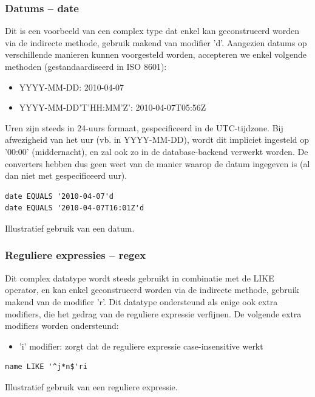 \subsubsection{Datums -- date}

Dit is een voorbeeld van een complex type dat enkel kan geconstrueerd worden via de indirecte methode, gebruik makend van modifier 'd'. Aangezien datums op verschillende manieren kunnen voorgesteld worden, accepteren we enkel volgende methoden (gestandaardiseerd in ISO 8601):
\begin{itemize}
\item{YYYY-MM-DD: 2010-04-07}
\item{YYYY-MM-DD'T'HH:MM'Z': 2010-04-07T05:56Z}
\end{itemize}

Uren zijn steeds in 24-uurs formaat, gespecificeerd in de UTC-tijdzone. Bij afwezigheid van het uur (vb. in YYYY-MM-DD), wordt dit impliciet ingesteld op '00:00' (middernacht), en zal ook zo in de database-backend verwerkt worden. De converters hebben dus geen weet van de manier waarop de datum ingegeven is (al dan niet met gespecificeerd uur).

\begin{code}
\begin{verbatim}
date EQUALS '2010-04-07'd
date EQUALS '2010-04-07T16:01Z'd
\end{verbatim}
\caption{Illustratief gebruik van een datum.}
\end{code}

\subsubsection{Reguliere expressies -- regex}

Dit complex datatype wordt steeds gebruikt in combinatie met de LIKE operator, en kan enkel geconstrueerd worden via de indirecte methode, gebruik makend van de modifier 'r'. Dit datatype ondersteund als enige ook extra modifiers, die het gedrag van de reguliere expressie verfijnen. De volgende extra modifiers worden ondersteund:
\begin{itemize}
\item 'i' modifier: zorgt dat de reguliere expressie case-insensitive werkt
\end{itemize}

\begin{code}
\begin{verbatim}
name LIKE '^j*n$'ri
\end{verbatim}
\caption{Illustratief gebruik van een reguliere expressie.}
\end{code}

